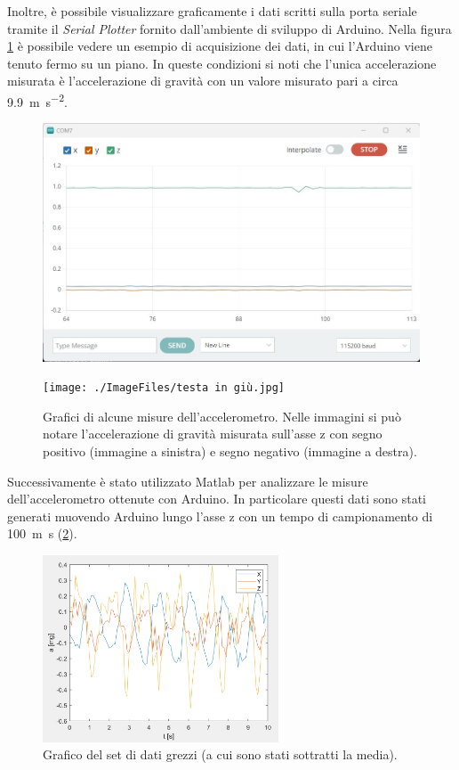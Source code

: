 Inoltre, è possibile visualizzare graficamente i dati scritti sulla porta seriale tramite il \textit{Serial Plotter} fornito dall'ambiente di sviluppo di Arduino. Nella figura \ref{fig:serial_plotter} è possibile vedere un esempio di acquisizione dei dati, in cui l'Arduino viene tenuto fermo su un piano. In queste condizioni si noti che l'unica accelerazione misurata è l'accelerazione di gravità con un valore misurato pari a circa \SI{9.9}{\meter \per \second^2}.
\begin{figure}[tbh]
	\centering
	\begin{minipage}{.45\textwidth}
		\includegraphics[width=\linewidth]{./ImageFiles/fermo.jpg}
	\end{minipage}
	\begin{minipage}{.45\textwidth}
		\texttt{[image: ./ImageFiles/testa in giù.jpg]}
	\end{minipage}
	\caption{Grafici di alcune misure dell'accelerometro. Nelle immagini si può notare l'accelerazione di gravità misurata sull'asse z con segno positivo (immagine a sinistra) e segno negativo (immagine a destra).}
	\label{fig:serial_plotter}
\end{figure}
\newpage
Successivamente è stato utilizzato Matlab per analizzare le misure dell'accelerometro ottenute con Arduino. In particolare questi dati sono stati generati muovendo Arduino lungo l'asse z con un tempo di campionamento di \SI{100}{m\second} (\Fig \ref{fig:plot_dati}).
\begin{figure}[h]
	\centering		
	\includegraphics[width=7cm]{./ImageFiles/plot1_arr2.png}
	\caption{Grafico del set di dati grezzi (a cui sono stati sottratti la media).}
	\label{fig:plot_dati}
\end{figure}
